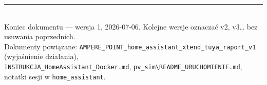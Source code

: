 \documentclass[11pt,a4paper]{article}
\begin{document}
\vspace{8pt}
\begin{center}
\textcolor{navy}{\rule{0.6\textwidth}{0.4pt}}\\[4pt]
{\small Koniec dokumentu --- wersja 1, 2026-07-06. Kolejne wersje oznaczać v2, v3\ldots{} bez usuwania poprzednich.\\
Dokumenty powiązane: \texttt{AMPERE\_POINT\_home\_assistant\_xtend\_tuya\_raport\_v1} (wyjaśnienie działania),\\ \texttt{INSTRUKCJA\_HomeAssistant\_Docker.md}, \texttt{pv\_sim\textbackslash README\_URUCHOMIENIE.md}, notatki sesji w \texttt{home\_assistant}.}
\end{center}
\end{document}
